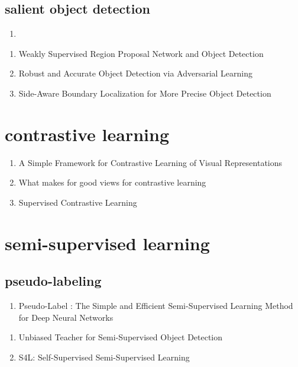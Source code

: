 \documentclass[acmlarge]{acmart}
\begin{document}
	\subsection{salient object detection}
	\begin{enumerate}
		\item
	\end{enumerate}
\begin{enumerate}
	\item Weakly Supervised Region Proposal Network and Object Detection \cite{Tang2018WeaklySR} 

	\item Robust and Accurate Object Detection via Adversarial Learning \cite{Chen2021RobustAA} 

	\item Side-Aware Boundary Localization for More Precise Object Detection \cite{Wang2020SideAwareBL} 

\end{enumerate}
\section{contrastive learning}
\begin{enumerate}
	\item A Simple Framework for Contrastive Learning of Visual Representations \cite{Chen2020ASF} 

	\item What makes for good views for contrastive learning \cite{Tian2020WhatMF} 

	\item Supervised Contrastive Learning \cite{Khosla2020SupervisedCL} 

\end{enumerate}
\section{semi-supervised learning}
	\subsection{pseudo-labeling}
	\begin{enumerate}
		\item Pseudo-Label : The Simple and Efficient Semi-Supervised Learning Method for Deep Neural Networks \cite{Lee2013PseudoLabelT} 

	\end{enumerate}
\begin{enumerate}
	\item Unbiased Teacher for Semi-Supervised Object Detection \cite{Liu2021UnbiasedTF} 

	\item S4L: Self-Supervised Semi-Supervised Learning \cite{Zhai2019S4LSS} 

\end{enumerate}
\end{document}
